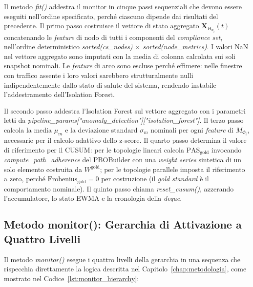 Il metodo \textit{fit()} addestra il monitor in cinque passi sequenziali che devono essere
eseguiti nell'ordine specificato, perché ciascuno dipende dai risultati del precedente. Il primo
passo costruisce il vettore di stato aggregato $\mathbf{X}_{H_{\Phi_i}}(t)$ concatenando le
\textit{feature} di nodo di tutti i componenti del \textit{compliance set}, nell'ordine
deterministico \textit{sorted(cs\_nodes) $\times$ sorted(node\_metrics)}. I valori NaN nel
vettore aggregato sono imputati con la media di colonna calcolata sui soli snapshot nominali.
Le \textit{feature} di arco sono escluse perché effimere: nelle finestre con traffico assente
i loro valori sarebbero strutturalmente nulli indipendentemente dallo stato di salute del sistema,
rendendo instabile l'addestramento dell'Isolation Forest.

Il secondo passo addestra l'Isolation Forest sul vettore aggregato con i parametri letti da
\textit{pipeline\_params["anomaly\_detection"]["isolation\_forest"]}. Il terzo passo calcola
la media $\mu_m$ e la deviazione standard $\sigma_m$ nominali per ogni \textit{feature} di
$M_{\Phi_i}$, necessarie per il calcolo adattivo dello z-score. Il quarto passo determina il
valore di riferimento per il \gls{CUSUM}: per le topologie lineari calcola
$\text{PAS}_{\text{gold}}$ invocando \textit{compute\_path\_adherence} del PBOBuilder con una
\textit{weight series} sintetica di un solo elemento costruita da $W^{\text{gold}}$; per le
topologie parallele imposta il riferimento a zero, perché $\text{Frobenius}_{\text{gold}} = 0$
per costruzione (il \textit{gold standard} è il comportamento nominale). Il quinto passo chiama
\textit{reset\_cusum()}, azzerando l'accumulatore, lo stato \gls{EWMA} e la cronologia della
\textit{deque}.

\subsection{Metodo monitor(): Gerarchia di Attivazione a Quattro Livelli}
\label{subsec:monitor_levels}

Il metodo \textit{monitor()} esegue i quattro livelli della gerarchia in una sequenza che
rispecchia direttamente la logica descritta nel Capitolo~\ref{chap:metodologia},
come mostrato nel Codice~\ref{lst:monitor_hierarchy}:

